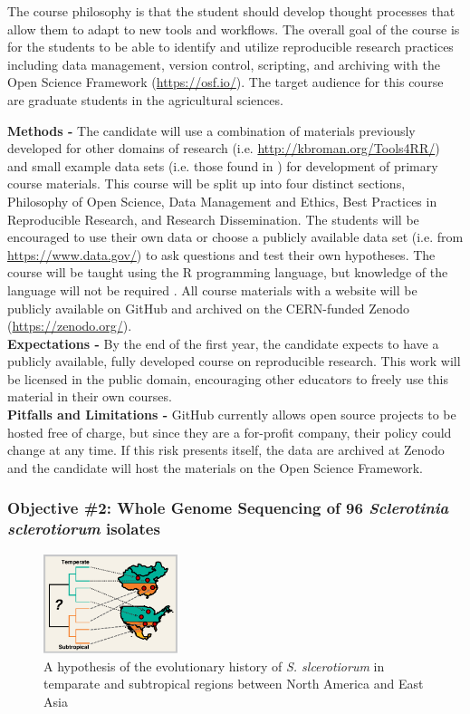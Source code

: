 \documentclass[12pt,letterpaper]{article}
\begin{document}
The course philosophy is that the student should develop thought processes that allow them to adapt to new tools and workflows. 
The overall goal of the course is for the students to be able to identify and utilize reproducible research practices including data management, version control, scripting, and archiving with the Open Science Framework (\url{https://osf.io/}).
The target audience for this course are graduate students in the agricultural sciences.

\noindent \textbf{Methods -} 
The candidate will use a combination of materials previously developed for other domains of research (i.e. \url{http://kbroman.org/Tools4RR/}) and small example data sets (i.e. those found in \citet{sparks2008ecology}) for development of primary course materials. 
This course will be split up into four distinct sections, Philosophy of Open Science, Data Management and Ethics, Best Practices in Reproducible Research, and Research Dissemination.
The students will be encouraged to use their own data or choose a publicly available data set (i.e. from \url{https://www.data.gov/}) to ask questions and test their own hypotheses.
The course will be taught using the R programming language, but knowledge of the language will not be required \citep{R2017}.
All course materials with a website will be publicly available on GitHub and archived on the CERN-funded Zenodo (\url{https://zenodo.org/}).\\
\noindent \textbf{Expectations -}
By the end of the first year, the candidate expects to have a publicly available, fully developed course on reproducible research.
This work will be licensed in the public domain, encouraging other educators to freely use this material in their own courses.\\
\noindent \textbf{Pitfalls and Limitations -}
GitHub currently allows open source projects to be hosted free of charge, but since they are a for-profit company, their policy could change at any time. If this risk presents itself, the data are archived at Zenodo and the candidate will host the materials on the Open Science Framework.

\subsubsection{Objective \#2: Whole Genome Sequencing of 96 \textit{Sclerotinia sclerotiorum} isolates}

\begin{figure} %
  \includegraphics[width=0.35\textwidth]{figure/us-china.pdf}
  \caption{A hypothesis of the evolutionary history of \textit{S. slcerotiorum} in temparate and subtropical regions between North America and East Asia}
  \label{fig:us-china}
\end{figure}
\end{document}
